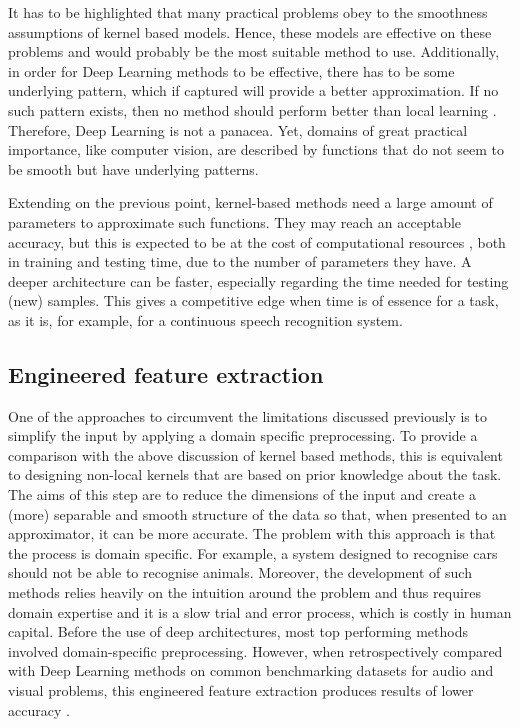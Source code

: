 \documentclass[a4paper]{article}
\begin{document}
		It has to be highlighted that many practical problems obey to the smoothness assumptions of kernel based models. Hence, these models are effective on these problems and would probably be the most suitable method to use. Additionally, in order for Deep Learning methods to be effective, there has to be some underlying pattern, which if captured will provide a better approximation. If no such pattern exists, then no method should perform better than local learning \cite{Bengio2009}. Therefore, Deep Learning is not a panacea. Yet, domains of great practical importance, like computer vision, are described by functions that do not seem to be smooth but have underlying patterns.
		
		Extending on the previous point, kernel-based methods need a large amount of parameters to approximate such functions. They may reach an acceptable accuracy, but this is expected to be at the cost of computational resources \cite{Bengio2007}, both in training and testing time, due to the number of parameters they have. A deeper architecture can be faster, especially regarding the time needed for testing (new) samples. This gives a competitive edge when time is of essence for a task, as it is, for example, for a continuous speech recognition system.
		
	\subsection{Engineered feature extraction}
	\label{sub: eng. features}
		One of the approaches to circumvent the limitations discussed previously is to simplify the input by applying a domain specific preprocessing. To provide a comparison with the above discussion of kernel based methods, this is equivalent to designing non-local kernels that are based on prior knowledge about the task. The aims of this step are to reduce the dimensions of the input and create a (more) separable and smooth structure of the data so that, when presented to an approximator, it can be more accurate. The problem with this approach is that the process is domain specific\cite{Bengio2007}. For example, a system designed to recognise cars should not  be able to recognise animals. Moreover, the development of such methods relies heavily on the intuition around the problem and thus requires domain expertise and it is a slow trial and error process, which is costly in human capital. Before the use of deep architectures, most top performing methods involved domain-specific preprocessing. However, when retrospectively compared with Deep Learning methods on common benchmarking datasets for audio and visual problems, this engineered feature extraction produces results of lower accuracy \cite{Krizhevsky2012}. 
		
\end{document}
